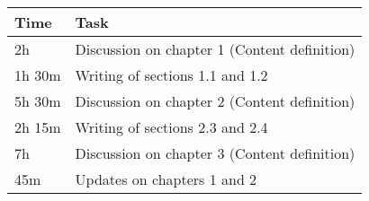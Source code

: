 \begin{center}
    {\renewcommand{\arraystretch}{2}%
    \begin{tabular}{L{2cm}L{12cm}}
        \hline
        \textbf{Time} & \textbf{Task} \\
        \hline
        2h & Discussion on chapter 1 (Content definition) \\
        \hline
        1h 30m & Writing of sections 1.1 and 1.2 \\
        \hline
        5h 30m & Discussion on chapter 2 (Content definition) \\
        \hline
        2h 15m & Writing of sections 2.3 and 2.4 \\
        \hline
        7h & Discussion on chapter 3 (Content definition) \\
        \hline
        45m & Updates on chapters 1 and 2 \\
        \hline
    \end{tabular}}
\end{center}